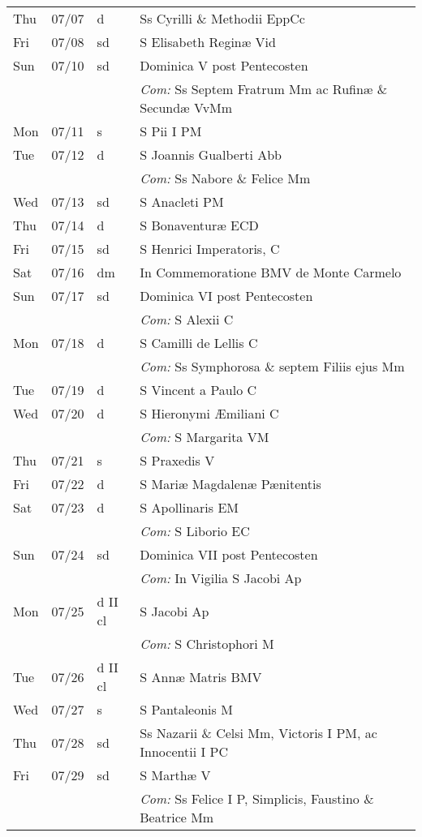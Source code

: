 \documentclass[10pt]{article}
\begin{document}
\begin{longtable}{ l l l l }
Thu & 07/07 & d & Ss Cyrilli \& Methodii EppCc\\
Fri & 07/08 & sd & S Elisabeth Reginæ Vid\\
Sun & 07/10 & sd & Dominica V post Pentecosten\\
 & & & \textit{Com:} Ss Septem Fratrum Mm ac Rufinæ \& Secundæ VvMm\\
Mon & 07/11 & s & S Pii I PM\\
Tue & 07/12 & d & S Joannis Gualberti Abb\\
 & & & \textit{Com:} Ss Nabore \& Felice Mm\\
Wed & 07/13 & sd & S Anacleti PM\\
Thu & 07/14 & d & S Bonaventuræ ECD\\
Fri & 07/15 & sd & S Henrici Imperatoris, C\\
Sat & 07/16 & dm & In Commemoratione BMV de Monte Carmelo\\
Sun & 07/17 & sd & Dominica VI post Pentecosten\\
 & & & \textit{Com:} S Alexii C\\
Mon & 07/18 & d & S Camilli de Lellis C\\
 & & & \textit{Com:} Ss Symphorosa \& septem Filiis ejus Mm\\
Tue & 07/19 & d & S Vincent a Paulo C\\
Wed & 07/20 & d & S Hieronymi Æmiliani C\\
 & & & \textit{Com:} S Margarita VM\\
Thu & 07/21 & s & S Praxedis V\\
Fri & 07/22 & d & S Mariæ Magdalenæ Pænitentis\\
Sat & 07/23 & d & S Apollinaris EM\\
 & & & \textit{Com:} S Liborio EC\\
Sun & 07/24 & sd & Dominica VII post Pentecosten\\
 & & & \textit{Com:} In Vigilia S Jacobi Ap\\
Mon & 07/25 & d II cl & S Jacobi Ap\\
 & & & \textit{Com:} S Christophori M\\
Tue & 07/26 & d II cl & S Annæ Matris BMV\\
Wed & 07/27 & s & S Pantaleonis M\\
Thu & 07/28 & sd & Ss Nazarii \& Celsi Mm, Victoris I PM, ac Innocentii I PC\\
Fri & 07/29 & sd & S Marthæ V\\
 & & & \textit{Com:} Ss Felice I P, Simplicis, Faustino \& Beatrice Mm\\

\end{longtable}
\end{document}
